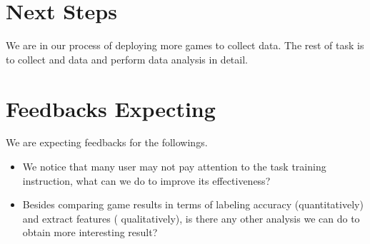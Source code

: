 \documentclass{article}
\begin{document}
\section{Next Steps}

We are in our process of deploying more games to collect data. The rest of task is to collect and data and perform data analysis in detail.

\section{Feedbacks Expecting}

We are expecting feedbacks for the followings.
\begin{itemize}\itemsep-1pt
\item We notice that many user may not pay attention to the task training instruction, what can we do to improve its effectiveness?
\item Besides comparing game results in terms of labeling accuracy (quantitatively) and extract features ( qualitatively), is there any other analysis we can do to obtain more interesting result?
\end{itemize}
\end{document}
